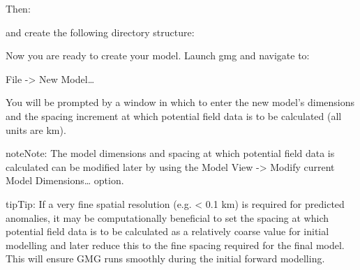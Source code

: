 \documentclass[a4paper,12pt,english]{sphinxmanual}
\begin{document}
\begin{sphinxVerbatim}[commandchars=\\\{\}]
 
\end{sphinxVerbatim}

Then:

\begin{sphinxVerbatim}[commandchars=\\\{\}]
 
\end{sphinxVerbatim}

and create the following directory structure:

\begin{sphinxVerbatim}[commandchars=\\\{\}]
         
\end{sphinxVerbatim}

Now you are ready to create your model. Launch gmg and navigate to:

File -\textgreater{} New Model…

You will be prompted by a window in which to enter the new model’s dimensions and the spacing
increment at which potential field data is to be calculated (all units are km).

\begin{sphinxadmonition}{note}{Note:}
The model dimensions and spacing at which potential field data is calculated can be modified later by using the
Model View -\textgreater{} Modify current Model Dimensions… option.
\end{sphinxadmonition}

\begin{sphinxadmonition}{tip}{Tip:}
If a very fine spatial resolution (e.g. \textless{} 0.1 km) is required for predicted anomalies, it may be computationally beneficial to set
the  spacing at which potential field data is to be calculated as a relatively coarse value for initial modelling
and later reduce this to the fine spacing required for the final model. This will ensure GMG runs smoothly during
the initial forward modelling.
\end{sphinxadmonition}

\begin{DUlineblock}{0em}
\item[] 
\end{DUlineblock}
\end{document}
